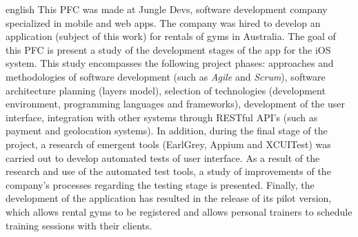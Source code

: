 \begin{resumo}[Abstract]
 \begin{otherlanguage*}{english}
 This PFC was made at Jungle Devs, software development company specialized in mobile and web apps. The company was hired to develop an application (subject of this work) for rentals of gyms in Australia. The goal of this PFC is present a study of the development stages of the app for the iOS system. This study encompasses the following project phases: approaches and methodologies of software development (such as \textit{Agile} and \textit{Scrum}), software architecture planning (layers model), selection of technologies (development environment, programming languages and frameworks), development of the user interface, integration with other systems through RESTful API's (such as payment and geolocation systems). In addition, during the final stage of the project, a research of emergent tools (EarlGrey, Appium and XCUITest) was carried out to develop automated tests of user interface. As a result of the research and use of the automated test tools, a study of improvements of the company's processes regarding the testing stage is presented. Finally, the development of the application has resulted in the release of its pilot version, which allows rental gyms to be registered and allows personal trainers to schedule training sessions with their clients.
 \end{otherlanguage*}
\end{resumo}
